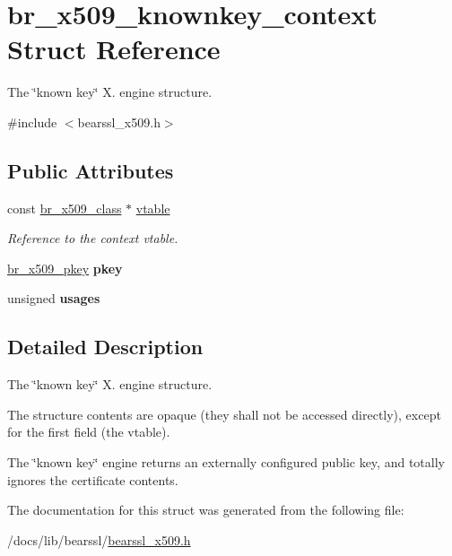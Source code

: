 \hypertarget{structbr__x509__knownkey__context}{}\section{br\+\_\+x509\+\_\+knownkey\+\_\+context Struct Reference}
\label{structbr__x509__knownkey__context}


The \char`\"{}known key\char`\"{} X. engine structure.  




{\ttfamily \#include $<$bearssl\+\_\+x509.\+h$>$}

\subsection*{Public Attributes}
\begin{DoxyCompactItemize}
\item 
\mbox{\label{structbr__x509__knownkey__context_a22524872202ea576776e904a80aea92f}} 
const \hyperlink{bearssl__x509_8h_acf3af5c1ad4007b178e4c6d68ce5bb0d}{br\+\_\+x509\+\_\+class} $\ast$ \hyperlink{structbr__x509__knownkey__context_a22524872202ea576776e904a80aea92f}{vtable}
\begin{DoxyCompactList}\small\item\em Reference to the context vtable. \end{DoxyCompactList}\item 
\mbox{\label{structbr__x509__knownkey__context_aeb0d56f81d809b91c30885f66c6af6f6}} 
\hyperlink{structbr__x509__pkey}{br\+\_\+x509\+\_\+pkey} {\bfseries pkey}
\item 
\mbox{\label{structbr__x509__knownkey__context_a90887f15cb8e35f9f125a313bd8fd1e0}} 
unsigned {\bfseries usages}
\end{DoxyCompactItemize}


\subsection{Detailed Description}
The \char`\"{}known key\char`\"{} X. engine structure. 

The structure contents are opaque (they shall not be accessed directly), except for the first field (the vtable).

The \char`\"{}known key\char`\"{} engine returns an externally configured public key, and totally ignores the certificate contents. 

The documentation for this struct was generated from the following file\+:\begin{DoxyCompactItemize}
\item 
/docs/lib/bearssl/\hyperlink{bearssl__x509_8h}{bearssl\+\_\+x509.\+h}\end{DoxyCompactItemize}
